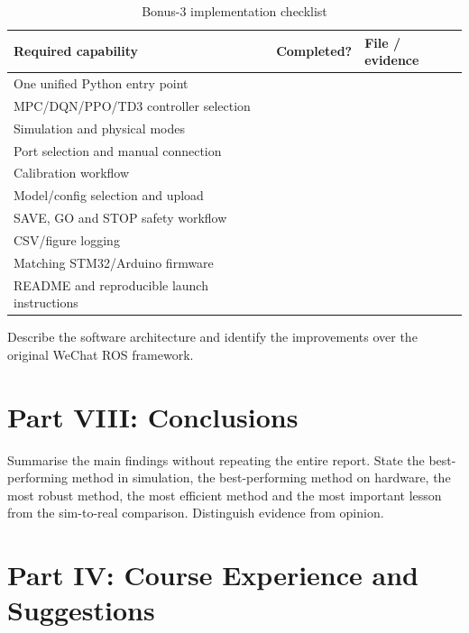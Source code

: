 \documentclass[11pt,a4paper]{article}
\newcommand{\studenttext}[1]{\begin{studentbox}\vspace{#1}\end{studentbox}}
\newcommand{\code}[1]{\texttt{\detokenize{#1}}}
\begin{document}
\begin{table}[H]
\centering
\caption{Bonus-3 implementation checklist}
\label{tab:bonus3check}
\begin{tabularx}{\linewidth}{Y C Y}
\toprule
Required capability & Completed? & File / evidence\\
\midrule
One unified Python entry point & & \\
MPC/DQN/PPO/TD3 controller selection & & \\
Simulation and physical modes & & \\
Port selection and manual connection & & \\
Calibration workflow & & \\
Model/config selection and upload & & \\
SAVE, GO and STOP safety workflow & & \\
CSV/figure logging & & \\
Matching STM32/Arduino \code{.ino} firmware & & \\
README and reproducible launch instructions & & \\
\bottomrule
\end{tabularx}
\end{table}

Describe the software architecture and identify the improvements over the
original WeChat ROS framework.

\studenttext{12mm}

\section{Part VIII: Conclusions}
\label{sec:conclusion}

Summarise the main findings without repeating the entire report. State the
best-performing method in simulation, the best-performing method on hardware,
the most robust method, the most efficient method and the most important lesson
from the sim-to-real comparison. Distinguish evidence from opinion.

\studenttext{45mm}

\appendix


\section{Part IV: Course Experience and Suggestions}
\end{document}

